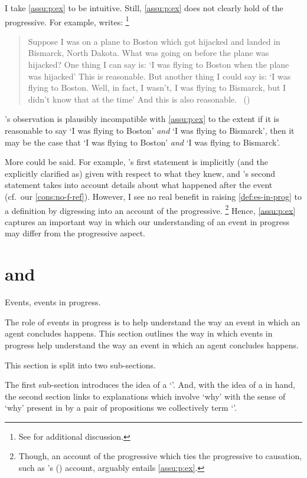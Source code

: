 \begin{note}
  I take \autoref{assu:p:ex} to be intuitive.
  Still, \autoref{assu:p:ex} does not clearly hold of the progressive.
  For example, \citeauthor{Landman:1992wh} writes:%
  \footnote{
    See \textcite{Bonomi:1997uq} for additional discussion.
  }

  \begin{quote}
    Suppose I was on a plane to Boston which got hijacked and landed in Bismarck, North Dakota.
    What was going on before the plane was hijacked?
    One thing I can say is:
    `I was flying to Boston when the plane was hijacked'
    This is reasonable.
    But another thing I could say is:
    `I was flying to Boston.
    Well, in fact, I wasn't, I was flying to Bismarck, but I didn't know that at the time'
    And this is also reasonable.%
    \mbox{ }\hfill\mbox{(\citeyear[30--31]{Landman:1992wh})}
  \end{quote}
  \citeauthor{Landman:1992wh}'s observation is plausibly incompatible with \autoref{assu:p:ex} to the extent if it is reasonable to say `I was flying to Boston' \emph{and} `I was flying to Bismarck', then it may be the case that `I was flying to Boston' \emph{and} `I was flying to Bismarck'.

  More could be said.
  For example, \citeauthor{Landman:1992wh}'s first statement is implicitly (and the explicitly clarified as) given with respect to what they knew, and \citeauthor{Landman:1992wh}'s second statement takes into account details about what happened after the event (cf.\ our \autoref{cons:no-f-ref}).
  However, I see no real benefit in raising \autoref{def:es-in-prog} to a definition by digressing into an account of the progressive.%
  \footnote{
    Though, an account of the progressive which ties the progressive to causation, such as \citeauthor{Szabo:2004ul}'s (\citeyear{Szabo:2004ul}) account, arguably entails \autoref{assu:p:ex}.
  }
  Hence, \autoref{assu:p:ex} captures an important way in which our understanding of an event in progress may differ from the progressive aspect.
\end{note}



\section{ and \progEx{}}
\label{sec:se3-progex}


\begin{note}
  Events, events in progress.

  The role of events in progress is to help understand the way an event in which an agent concludes happens.
  This section outlines the way in which events in progress help understand the way an event in which an agent concludes happens.

  This section is split into two sub-sections.

  The first sub-section introduces the idea of a `\se{}'.
  And, with the idea of a \se{} in hand, the second section links \se{} to explanations which involve `why' with the sense of `why' present in \qWhy{} by a pair of propositions we collectively term `\progEx{}'.
\end{note}



